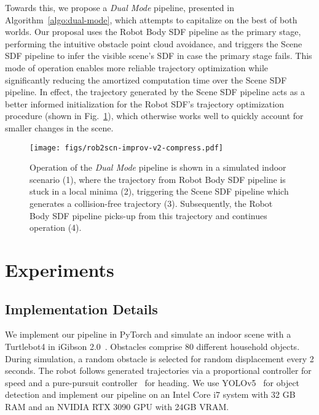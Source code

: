 \documentclass[letterpaper, 10 pt, conference]{ieeeconf}  %
\begin{document}
Towards this, we propose a \emph{Dual Mode} pipeline, presented in Algorithm~\ref{algo:dual-mode}, which attempts to capitalize on the best of both worlds.
Our proposal uses the Robot Body SDF pipeline as the primary stage, performing the intuitive obstacle point cloud avoidance, and triggers the Scene SDF pipeline to infer the visible scene's SDF in case the primary stage fails.
This mode of operation enables more reliable trajectory optimization while significantly reducing the amortized computation time over the Scene SDF pipeline.
In effect, the trajectory generated by the Scene SDF pipeline acts as a better informed initialization for the Robot SDF's trajectory optimization procedure (shown in Fig.~\ref{fig:dual-mode-in-action}), which otherwise works well to quickly account for smaller changes in the scene.

\begin{figure}[t]
    \centering\vspace{2mm}
    \texttt{[image: figs/rob2scn-improv-v2-compress.pdf]}
    \caption{\label{fig:dual-mode-in-action}
        Operation of the \emph{Dual Mode} pipeline is shown in a simulated indoor scenario (1), where the trajectory from Robot Body SDF pipeline is stuck in a local minima (2), triggering the Scene SDF pipeline which generates a collision-free trajectory (3).
        Subsequently, the Robot Body SDF pipeline picks-up from this trajectory and continues operation (4).
    }
    \vspace{-3mm}
\end{figure}

\section{Experiments}

\subsection{Implementation Details}

We implement our pipeline in PyTorch and simulate an indoor scene with a Turtlebot4 in iGibson 2.0~\cite{igibson21}.
Obstacles comprise 80 different household objects.
During simulation, a random obstacle is selected for random displacement every 2 seconds.
The robot follows generated trajectories via a proportional controller for speed and a pure-pursuit controller~\cite{coulter1992purepursuit} for heading.
We use YOLOv5~\cite{yolov5} for object detection and implement our pipeline on an Intel Core i7 system with 32 GB RAM and an NVIDIA RTX 3090 GPU with 24GB VRAM.
\end{document}
